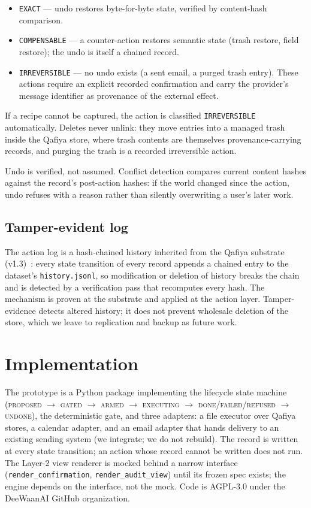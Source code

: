 \documentclass[11pt]{article}
\begin{document}
\begin{itemize}[nosep]
  \item \texttt{EXACT} --- undo restores byte-for-byte state, verified by
        content-hash comparison.
  \item \texttt{COMPENSABLE} --- a counter-action restores semantic state
        (trash restore, field restore); the undo is itself a chained record.
  \item \texttt{IRREVERSIBLE} --- no undo exists (a sent email, a purged trash
        entry). These actions require an explicit recorded confirmation and
        carry the provider's message identifier as provenance of the external
        effect.
\end{itemize}

If a recipe cannot be captured, the action is classified \texttt{IRREVERSIBLE}
automatically. Deletes never unlink: they move entries into a managed trash
inside the Qafiya store, where trash contents are themselves provenance-carrying
records, and purging the trash is a recorded irreversible action.

Undo is verified, not assumed. Conflict detection compares current content hashes
against the record's post-action hashes: if the world changed since the action,
undo refuses with a reason rather than silently overwriting a user's later work.

\subsection{Tamper-evident log}

The action log is a hash-chained history inherited from the Qafiya substrate
(v1.3)~\cite{qafiya}: every state transition of every record appends a chained
entry to the dataset's \texttt{history.jsonl}, so modification or deletion of
history breaks the chain and is detected by a verification pass that recomputes
every hash. The mechanism is proven at the substrate and applied at the action
layer. Tamper-evidence detects altered
history; it does not prevent wholesale deletion of the store, which we leave to
replication and backup as future work.

\section{Implementation}

The prototype is a Python package implementing the lifecycle state machine
(\textsc{proposed} $\to$ \textsc{gated} $\to$ \textsc{armed} $\to$
\textsc{executing} $\to$ \textsc{done}/\textsc{failed}/\textsc{refused} $\to$
\textsc{undone}), the deterministic gate, and three adapters: a file executor
over Qafiya stores, a calendar adapter, and an email adapter that hands delivery
to an existing sending system (we integrate; we do not rebuild). The record is
written at every state transition; an action whose record cannot be written does
not run. The Layer-2 view renderer is mocked behind a narrow interface
(\texttt{render\_confirmation}, \texttt{render\_audit\_view}) until its frozen
spec exists; the engine depends on the interface, not the mock. Code is AGPL-3.0
under the DeeWaanAI GitHub organization.
\end{document}
